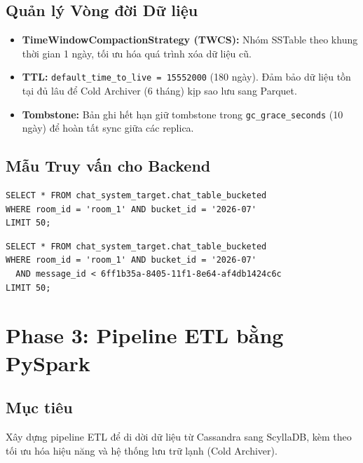 \documentclass[12pt,a4paper]{article}
\begin{document}
\subsection{Quản lý Vòng đời Dữ liệu}

\begin{itemize}[noitemsep]
    \item \textbf{TimeWindowCompactionStrategy (TWCS):} Nhóm SSTable theo khung thời gian 1 ngày, tối ưu hóa quá trình xóa dữ liệu cũ.
    \item \textbf{TTL:} \texttt{default\_time\_to\_live = 15552000} (180 ngày). Đảm bảo dữ liệu tồn tại đủ lâu để Cold Archiver (6 tháng) kịp sao lưu sang Parquet.
    \item \textbf{Tombstone:} Bản ghi hết hạn giữ tombstone trong \texttt{gc\_grace\_seconds} (10 ngày) để hoàn tất sync giữa các replica.
\end{itemize}

\subsection{Mẫu Truy vấn cho Backend}

\begin{lstlisting}[style=sqlstyle, caption={Truy xuất 50 tin nhắn mới nhất của một phòng chat.}]
SELECT * FROM chat_system_target.chat_table_bucketed
WHERE room_id = 'room_1' AND bucket_id = '2026-07'
LIMIT 50;
\end{lstlisting}

\begin{lstlisting}[style=sqlstyle, caption={Truy vấn phân trang (pagination) lịch sử tin nhắn.}]
SELECT * FROM chat_system_target.chat_table_bucketed
WHERE room_id = 'room_1' AND bucket_id = '2026-07'
  AND message_id < 6ff1b35a-8405-11f1-8e64-af4db1424c6c
LIMIT 50;
\end{lstlisting}

\newpage
\section{Phase 3: Pipeline ETL bằng PySpark}
\label{sec:phase3}

\subsection{Mục tiêu}
Xây dựng pipeline ETL để di dời dữ liệu từ Cassandra sang ScyllaDB, kèm theo tối ưu hóa hiệu năng và hệ thống lưu trữ lạnh (Cold Archiver).
\end{document}
